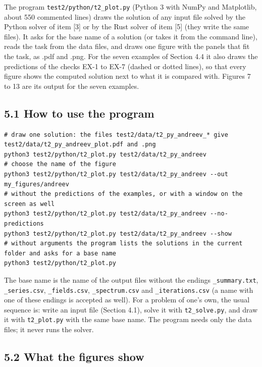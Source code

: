 \documentclass[
  10pt,
]{article}
\begin{document}
The program \texttt{test2/python/t2\_plot.py} (Python 3 with NumPy and
Matplotlib, about 550 commented lines) draws the solution of any input
file solved by the Python solver of item {[}3{]} or by the Rust solver
of item {[}5{]} (they write the same files). It asks for the base name
of a solution (or takes it from the command line), reads the task from
the data files, and draws one figure with the panels that fit the task,
as .pdf and .png. For the seven examples of Section 4.4 it also draws
the predictions of the checks EX-1 to EX-7 (dashed or dotted lines), so
that every figure shows the computed solution next to what it is
compared with. Figures 7 to 13 are its output for the seven examples.

\hypertarget{how-to-use-the-program-1}{%
\subsection{5.1 How to use the program}\label{how-to-use-the-program-1}}

\begin{verbatim}
# draw one solution: the files test2/data/t2_py_andreev_* give test2/data/t2_py_andreev_plot.pdf and .png
python3 test2/python/t2_plot.py test2/data/t2_py_andreev
# choose the name of the figure
python3 test2/python/t2_plot.py test2/data/t2_py_andreev --out my_figures/andreev
# without the predictions of the examples, or with a window on the screen as well
python3 test2/python/t2_plot.py test2/data/t2_py_andreev --no-predictions
python3 test2/python/t2_plot.py test2/data/t2_py_andreev --show
# without arguments the program lists the solutions in the current folder and asks for a base name
python3 test2/python/t2_plot.py
\end{verbatim}

The base name is the name of the output files without the endings
\texttt{\_summary.txt}, \texttt{\_series.csv}, \texttt{\_fields.csv},
\texttt{\_spectrum.csv} and \texttt{\_iterations.csv} (a name with one
of these endings is accepted as well). For a problem of one's own, the
usual sequence is: write an input file (Section 4.1), solve it with
\texttt{t2\_solve.py}, and draw it with \texttt{t2\_plot.py} with the
same base name. The program needs only the data files; it never runs the
solver.

\hypertarget{what-the-figures-show}{%
\subsection{5.2 What the figures show}\label{what-the-figures-show}}
\end{document}
